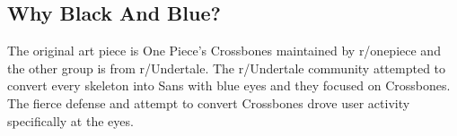 \subsection{Why Black And Blue?}
The original art piece is One Piece's Crossbones maintained by r/onepiece and the other group is from r/Undertale. The r/Undertale community attempted to convert every skeleton into Sans with blue eyes and they focused on Crossbones. The fierce defense and attempt to convert Crossbones drove user activity specifically at the eyes.